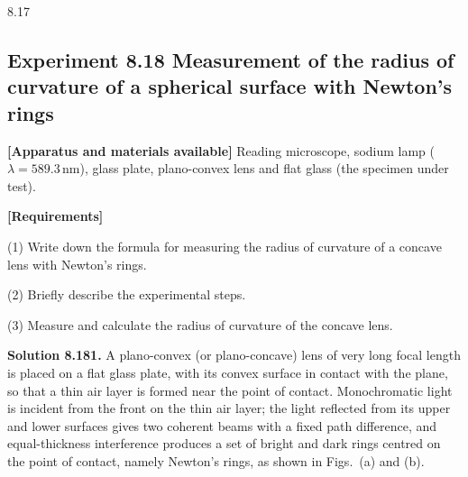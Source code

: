 \begin{figbox}{8.17}
\end{figbox}

\subsection*{Experiment 8.18 \quad Measurement of the radius of curvature of a spherical surface with Newton's rings}

\textbf{[Apparatus and materials available]} Reading microscope, sodium lamp ($\lambda=589.3\,\mathrm{nm}$), glass plate, plano-convex lens and flat glass (the specimen under test).

\textbf{[Requirements]}

(1) Write down the formula for measuring the radius of curvature of a concave lens with Newton's rings.

(2) Briefly describe the experimental steps.

(3) Measure and calculate the radius of curvature of the concave lens.

\textbf{Solution 8.18}\quad \textbf{1.} A plano-convex (or plano-concave) lens of very long focal length is placed on a flat glass plate, with its convex surface in contact with the plane, so that a thin air layer is formed near the point of contact. Monochromatic light is incident from the front on the thin air layer; the light reflected from its upper and lower surfaces gives two coherent beams with a fixed path difference, and equal-thickness interference produces a set of bright and dark rings centred on the point of contact, namely Newton's rings, as shown in Figs.~(a) and (b).


